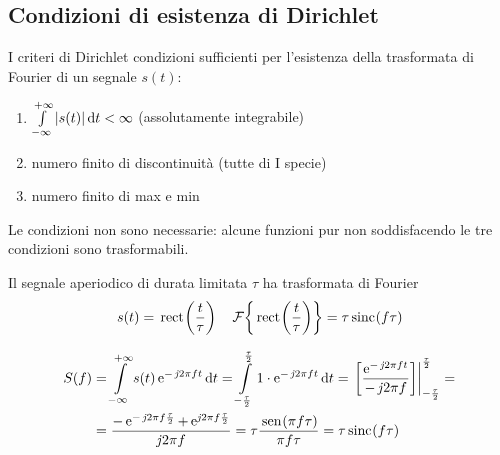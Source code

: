 \subsection{Condizioni di esistenza di Dirichlet}
I criteri di Dirichlet condizioni sufficienti per l'esistenza della trasformata di Fourier di un segnale $s(t)$:
\begin{enumerate}
\item $\int\limits_{-\infty}^{+\infty}{\left|{s(t)}\right|}{\,\mathop{}\!\mathrm{d}{t}}<\infty$ (assolutamente integrabile)
\item numero finito di discontinuità (tutte di I specie)
\item numero finito di max e min
\end{enumerate}
\begin{nota}Le condizioni non sono necessarie: alcune funzioni pur non soddisfacendo le tre condizioni sono trasformabili.\end{nota}
\begin{esempio}
Il segnale aperiodico di durata limitata $\tau$ ha trasformata di Fourier
\[s(t)=\,{\operatorname{rect}}^{}\!\left({\frac{t}{\tau}}\right)\quad\operatorname{\mathcal{F}}\!\left\lbrace{\,{\operatorname{rect}}^{}\!\left({\frac{t}{\tau}}\right)}\right\rbrace=\tau\,{\operatorname{sinc}}^{}\!\left({f\tau}\right) \]

\begin{figure}[h!]
\centering
{}\qquad
{}
\end{figure}

\[\begin{split}S(f)&=\intinf{s(t)\e{-\imath 2\pi f t}}{t}
=\intd{-\frac{\tau}{2}}{\frac{\tau}{2}}{1\cdot\e{-\imath 2\pi f t}}{t}
=\bound{-\frac{\tau}{2}}{\frac{\tau}{2}}{\frac{\e{-\imath 2\pi f t}}{-\imath 2\pi f}}=\\
&=\frac{-\e{-\imath 2\pi f\frac{\tau}{2}}+\e{\imath 2\pi f\frac{\tau}{2}}}{\imath 2\pi f}
=\tau\frac{\sen{\pi f\tau}}{\pi f\tau}
=\tau\sinc{f\tau}
\end{split}\]
\end{esempio}

